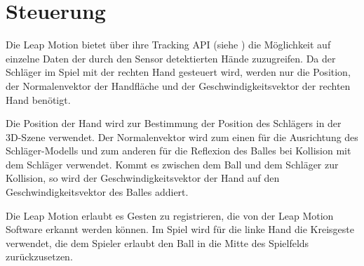 
\chapter{Steuerung}
\label{Kapitel 3}
%
Die Leap Motion bietet über ihre Tracking API (siehe \cite{leap}) die Möglichkeit auf einzelne Daten der durch den Sensor detektierten Hände zuzugreifen. Da der Schläger im Spiel mit der rechten Hand gesteuert wird, werden nur die Position, der Normalenvektor der Handfläche und der Geschwindigkeitsvektor der rechten Hand benötigt.

Die Position der Hand wird zur Bestimmung der Position des Schlägers in der 3D-Szene verwendet. Der Normalenvektor wird zum einen für die Ausrichtung des Schläger-Modells und zum anderen für die Reflexion des Balles bei Kollision mit dem Schläger verwendet. Kommt es zwischen dem Ball und dem Schläger zur Kollision, so wird der Geschwindigkeitsvektor der Hand auf den Geschwindigkeitsvektor des Balles addiert.

Die Leap Motion erlaubt es Gesten zu registrieren, die von der Leap Motion Software erkannt werden können. Im Spiel wird für die linke Hand die Kreisgeste verwendet, die dem Spieler erlaubt den Ball in die Mitte des Spielfelds zurückzusetzen.
%
